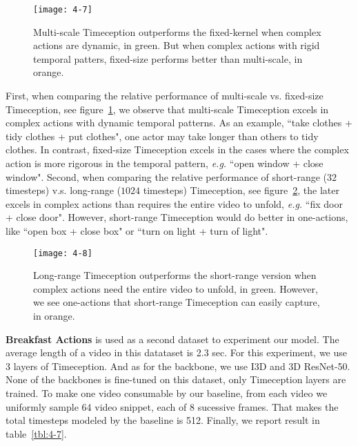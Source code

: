 \documentclass[10pt,twocolumn,letterpaper]{article}
\newcommand{\partitle}[1]{\noindent\textbf{#1}}
\begin{document}
\begin{figure}[ht]
\begin{center}
\texttt{[image: 4-7]}
\end{center}
\caption{
Multi-scale Timeception outperforms the fixed-kernel when complex actions are dynamic, in green.
But when complex actions with rigid temporal patters, fixed-size performs better than multi-scale, in orange.}
\label{fig:4-7}
\vspace*{-3mm}
\end{figure}

First, when comparing the relative performance of multi-scale vs. fixed-size Timeception, see figure~\ref{fig:4-7}, we observe that multi-scale Timeception excels in complex actions with dynamic temporal patterns.
As an example, ``take clothes + tidy clothes + put clothes", one actor may take longer than others to tidy clothes.
In contrast, fixed-size Timeception excels in the cases where the complex action is more rigorous in the temporal pattern, \emph{e.g.} ``open window + close window".
Second, when comparing the relative performance of short-range ($32$ timesteps) v.s. long-range ($1024$ timesteps) Timeception, see figure~\ref{fig:4-8}, the later excels in complex actions than requires the entire video to unfold, \textit{e.g.} ``fix door + close door".
However, short-range Timeception would do better in one-actions, like ``open box + close box" or ``turn on light + turn of light".

\begin{figure}[ht]
\begin{center}
\texttt{[image: 4-8]}
\end{center}
\caption{
Long-range Timeception outperforms the short-range version when complex actions need the entire video to unfold, in green.
However, we see one-actions that short-range Timeception can easily capture, in orange.}
\label{fig:4-8}
\vspace*{-3mm}
\end{figure}

\partitle{Breakfast Actions}
is used as a second dataset to experiment our model.
The average length of a video in this datataset is 2.3 sec.
For this experiment, we use 3 layers of Timeception.
And as for the backbone, we use I3D and 3D ResNet-50.
None of the backbones is fine-tuned on this dataset, only Timeception layers are trained.
To make one video consumable by our baseline, from each video we uniformly sample 64 video snippet, each of 8 sucessive frames.
That makes the total timesteps modeled by the baseline is 512.
Finally, we report result in table~\ref{tbl:4-7}.
\end{document}
